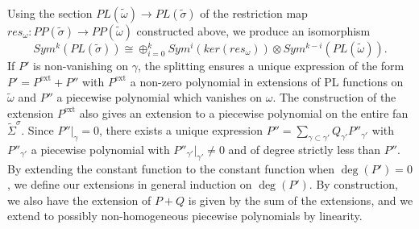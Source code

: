 \documentclass[12pt, oneside]{amsart}   	%
\newcommand{\gp}{\operatorname{gp}}
\numberwithin{equation}{section}
\numberwithin{thm}{section}
\numberwithin{figure}{section}
\begin{document}
Using the section $PL(\widetilde{\omega}) \rightarrow PL(\widetilde{\sigma})$ of the restriction map $res_{\omega}: PP(\widetilde{\sigma}) \rightarrow PP(\widetilde{\omega})$ constructed above, we produce an isomorphism $$Sym^k(PL(\widetilde{\sigma})) \cong \oplus_{i=0}^k Sym^i(ker(res_{\omega}))\otimes Sym^{k-i}(PL(\widetilde{\omega})).$$ If $P'$ is non-vanishing on $\gamma$, the splitting ensures a unique expression of the form $P' = P^{\text{ext}} + P''$ with $P^{\text{ext}}$ a non-zero polynomial in extensions of PL functions on $\tilde{\omega}$ and $P''$ a piecewise polynomial which vanishes on $\omega$. The construction of the extension $P^{\text{ext}}$ also gives an extension to a piecewise polynomial on the entire fan $\widetilde{\Sigma}^{\sigma}$. Since $P''|_{\gamma} = 0$, there exists a unique expression $P'' = \sum_{\gamma \subset \gamma'} Q_{\gamma'}P''_{\gamma'}$ with $P''_{\gamma'}$ a piecewise polynomial with $P''_{\gamma'}|_{\gamma'} \not= 0$ and of degree strictly less than $P''$. By extending the constant function to the constant function when $\deg(P') = 0$, we define our extensions in general induction on $\deg(P')$. By construction, we also have the extension of $P + Q$ is given by the sum of the extensions, and we extend to possibly non-homogeneous piecewise polynomials by linearity.




%
\end{document}
